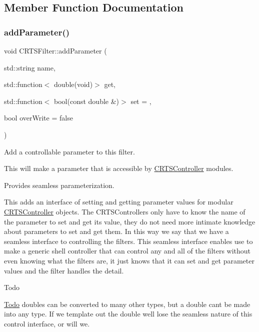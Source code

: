 \subsection{Member Function Documentation}
\mbox{\label{classCRTSFilter_acc17d29240468c94e360e1b788f5d6a0}} 
\subsubsection{\texorpdfstring{add\+Parameter()}{addParameter()}}
{\footnotesize\ttfamily void C\+R\+T\+S\+Filter\+::add\+Parameter (\begin{DoxyParamCaption}\item[{std\+::string}]{name,  }\item[{std\+::function$<$ double(void)$>$}]{get,  }\item[{std\+::function$<$ bool(const double \&)$>$}]{set = {},  }\item[{bool}]{over\+Write = {\ttfamily false} }\end{DoxyParamCaption})\hspace{0.3cm}{\ttfamily [protected]}}

Add a controllable parameter to this filter.

This will make a parameter that is accessible by \hyperlink{classCRTSController}{C\+R\+T\+S\+Controller} modules.

Provides seamless parameterization.

This adds an interface of setting and getting parameter values for modular \hyperlink{classCRTSController}{C\+R\+T\+S\+Controller} objects. The C\+R\+T\+S\+Controllers only have to know the {\ttfamily name} of the parameter to set and get its\textquotesingle{} value, they do not need more intimate knowledge about parameters to set and get them. In this way we say that we have a seamless interface to controlling the filters. This seamless interface enables use to make a generic shell controller that can control any and all of the filters without even knowing what the filters are, it just knows that it can set and get parameter values and the filter handles the detail.

\begin{DoxyRefDesc}{Todo}
\item[\hyperlink{todo__todo000001}{Todo}]doubles can be converted to many other types, but a double can\textquotesingle{}t be made into any type. If we template out the double we\textquotesingle{}ll lose the seamless nature of this control interface, or will we.\end{DoxyRefDesc}



